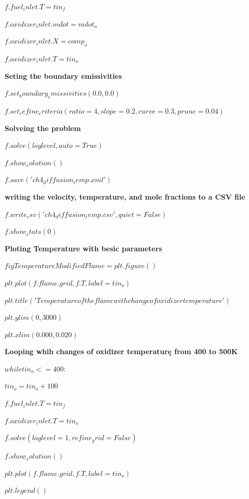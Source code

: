 \documentclass[a4paper]{article}
\begin{document}
$f.fuel_inlet.T = tin_f$

$f.oxidizer_inlet.mdot = mdot_o$

$f.oxidizer_inlet.X = comp_o$

$f.oxidizer_inlet.T = tin_o$

\textbf{Seting the boundary emissivities}

$f.set_boundary_emissivities(0.0, 0.0)$

$f.set_refine_criteria(ratio=4, slope=0.2, curve=0.3, prune=0.04)$

\textbf{Solveing the problem}

$f.solve(loglevel, auto=True)$

$f.show_solution()$

$f.save('ch4_diffusion_temp.xml')$

\textbf{writing the velocity, temperature, and mole fractions to a CSV file}

$f.write_csv('ch4_diffusion_temp.csv', quiet=False)$

$f.show_stats(0)$

\textbf{Ploting Temperature with besic parameters}

$figTemperatureModifiedFlame = plt.figure()$

$plt.plot(f.flame.grid, f.T, label=tin_o )$

$plt.title('Temperature of the flame with change of oxidizer temperature')$

$plt.ylim(0,3000)$

$plt.xlim(0.000, 0.020)$

\textbf{Looping whih changes of oxidizer temperaturę from 400 to 500K}

$while tin_o <= 400:$

\hspace{5,35mm}$    tin_o=tin_o+100$

\hspace{5,35mm}$    f.fuel_inlet.T = tin_f$

\hspace{5,35mm}$    f.oxidizer_inlet.T = tin_o$

\hspace{5,35mm}$    f.solve(loglevel=1, refine_grid=False)$

\hspace{5,35mm}$    f.show_solution()$

\hspace{5,35mm}$    plt.plot(f.flame.grid, f.T, label=tin_o)$

\hspace{5,35mm}$    plt.legend()$
\end{document}
